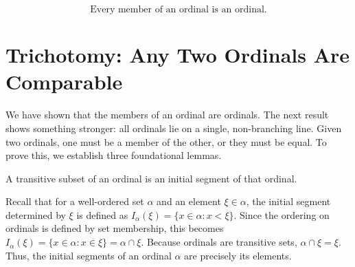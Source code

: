 \documentclass[11pt]{article}
\begin{document}
\[
\boxed{\text{Every member of an ordinal is an ordinal.}}
\]

\section{Trichotomy: Any Two Ordinals Are Comparable}

We have shown that the members of an ordinal are ordinals. The next result shows something stronger: all ordinals lie on a single, non-branching line. Given two ordinals, one must be a member of the other, or they must be equal. To prove this, we establish three foundational lemmas.

\begin{lemma}
A transitive subset of an ordinal is an initial segment of that ordinal.
\end{lemma}

Recall that for a well-ordered set $\alpha$ and an element $\xi \in \alpha$, the initial segment determined by $\xi$ is defined as $I_\alpha(\xi) = \{x \in \alpha : x < \xi\}$. Since the ordering on ordinals is defined by set membership, this becomes $I_\alpha(\xi) = \{x \in \alpha : x \in \xi\} = \alpha \cap \xi$. Because ordinals are transitive sets, $\alpha \cap \xi = \xi$. Thus, the initial segments of an ordinal $\alpha$ are precisely its elements.
\end{document}
